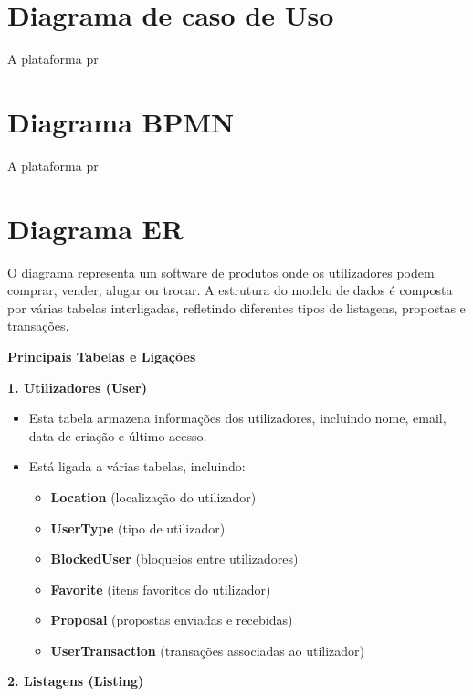 \documentclass[a4paper, 12pt]{article} %
\begin{document}
\section*{Diagrama de caso de Uso}

A plataforma pr
\newpage
\section*{Diagrama BPMN}

A plataforma pr


\newpage
\section*{Diagrama ER}

O diagrama representa um software de produtos onde os utilizadores podem comprar, vender, alugar ou trocar. A estrutura do modelo de dados é composta por várias tabelas interligadas, refletindo diferentes tipos de listagens, propostas e transações.

\textbf{Principais Tabelas e Ligações}

\textbf{1. Utilizadores (User)}

\begin{itemize}
    \item Esta tabela armazena informações dos utilizadores, incluindo nome, email, data de criação e último acesso.
    \item Está ligada a várias tabelas, incluindo:
    \begin{itemize}
        \item \textbf{Location} (localização do utilizador)
        \item \textbf{UserType} (tipo de utilizador)
        \item \textbf{BlockedUser} (bloqueios entre utilizadores)
        \item \textbf{Favorite} (itens favoritos do utilizador)
        \item \textbf{Proposal} (propostas enviadas e recebidas)
        \item \textbf{UserTransaction} (transações associadas ao utilizador)
    \end{itemize}
\end{itemize}
\textbf{2. Listagens (Listing)}
\end{document}

